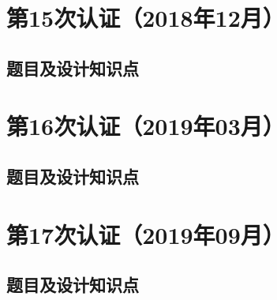 \documentclass[cn,10pt,math=newtx,citestyle=gb7714-2015,bibstyle=gb7714-2015]{elegantbook}
\begin{document}










\chapter{第15次认证（2018年12月）}

\section{题目及设计知识点}











\chapter{第16次认证（2019年03月）}

\section{题目及设计知识点}











\chapter{第17次认证（2019年09月）}

\section{题目及设计知识点}




\end{document}
